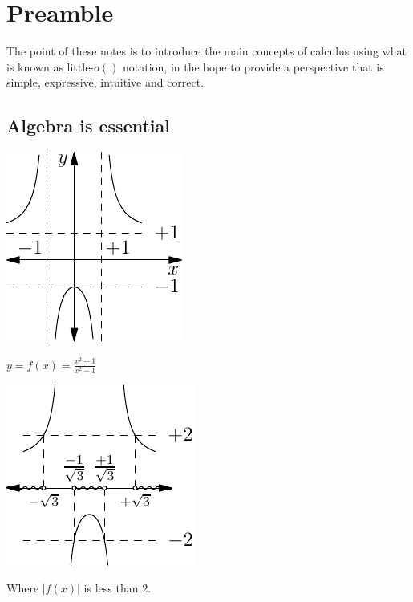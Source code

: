 \chapter*{Preamble}

The point of these notes is to introduce the main concepts of calculus using what is known as little-$o()$ notation, in the hope to provide a perspective that is simple, expressive, intuitive and correct.

\section*{Algebra is essential}
\begin{marginfigure}
\includegraphics[width=0.75\linewidth]{graphics/algebra1.pdf}
\caption{$y=f(x)=\frac{x^2+1}{x^2-1}$}
\label{fig:algebra1}
\end{marginfigure}
\begin{marginfigure}
\includegraphics[width=0.75\linewidth]{graphics/algebra2.pdf}
\caption{Where $|f(x)|$ is less than $2$.}
\label{fig:algebra2}
\end{marginfigure}
